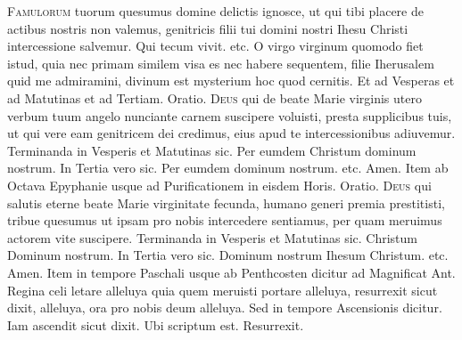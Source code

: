 \begin{multicols*}{2}
\lettrine[lines=2]{\zallmancaps \color{Blue} F}{amulorum} tuorum quesumus domine delictis ignosce, ut qui tibi placere de actibus nostris non valemus, genitricis filii tui domini nostri Ihesu Christi intercessione salvemur. Qui tecum vivit. etc.
 O virgo virginum quomodo fiet istud, quia nec primam similem visa es nec habere sequentem, filie Iherusalem quid me admiramini, divinum est mysterium hoc quod cernitis. {\color{Red} Et ad Vesperas et ad Matutinas et ad Tertiam. Oratio.}
\lettrine[lines=2]{\zallmancaps \color{Red} D}{eus} qui de beate Marie virginis utero verbum tuum angelo nunciante carnem suscipere voluisti, presta supplicibus tuis, ut qui vere eam genitricem dei credimus, eius apud te intercessionibus adiuvemur.
{\color{Red} Terminanda in Vesperis et Matutinas sic.} Per eumdem Christum dominum nostrum. {\color{Red} In Tertia vero sic.} Per eumdem dominum nostrum. etc. Amen. {\color{Red} Item ab Octava Epyphanie usque ad Purificationem in eisdem Horis. Oratio.}
\lettrine[lines=2]{\zallmancaps \color{Blue} D}{eus} qui salutis eterne beate Marie virginitate fecunda, humano generi premia prestitisti, tribue quesumus ut ipsam pro nobis intercedere sentiamus, per quam meruimus actorem vite suscipere.
{\color{Red} Terminanda in Vesperis et Matutinas sic.} Christum Dominum nostrum. {\color{Red} In Tertia vero sic.} Dominum nostrum Ihesum Christum. etc. Amen. {\color{Red} Item in tempore Paschali usque ab Penthcosten dicitur ad Magnificat Ant.} Regina celi letare alleluya quia quem meruisti portare alleluya, resurrexit sicut dixit, alleluya, ora pro nobis deum alleluya.
{\color{Red} Sed in tempore Ascensionis dicitur.} Iam ascendit sicut dixit. {\color{Red} Ubi scriptum est.} Resurrexit.



\end{multicols*}




\thispagestyle{fancy}
\fancyhead[RO,LE]{\rightmark}

